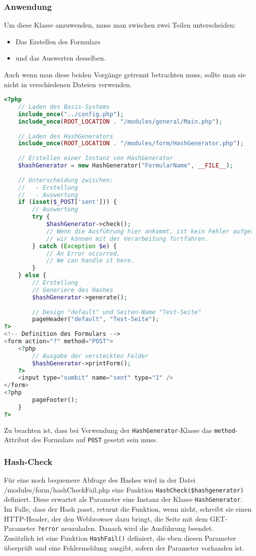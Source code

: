 \subsubsection{Anwendung}
Um diese Klasse anzuwenden, muss man zwischen zwei Teilen unterscheiden:
\begin{itemize}
	\item Das Erstellen des Formulars
	\item und das Auswerten desselben.
\end{itemize}
Auch wenn man diese beiden Vorgänge getrennt betrachten muss, sollte man sie nicht in verschiedenen Dateien verwenden.\\
\begin{lstlisting}[style=custom, language=php, caption={Anwendung von \texttt{HashGenerator}},label={lst:content_imple_hash_example}]
<?php
	// Laden des Basis-Systems
	include_once("../config.php");
	include_once(ROOT_LOCATION . "/modules/general/Main.php");
	
	// Laden des HashGenerators
	include_once(ROOT_LOCATION . "/modules/form/HashGenerator.php");
	
	// Erstellen einer Instanz von HashGenerator
	$hashGenerator = new HashGenerator("FormularName", __FILE__);
	
	// Unterscheidung zwischen:
	//   - Erstellung
	//   - Auswertung
	if (isset($_POST['sent'])) {
		// Auswertung
		try {
			$hashGenerator->check();
			// Wenn die Ausführung hier ankommt, ist kein Fehler aufgetreten,
			// wir können mit der Verarbeitung fortfahren.
		} catch (Exception $e) {
			// An Error occurred.
			// We can handle it here.
		}
	} else {
		// Erstellung
		// Generiere des Hashes
		$hashGenerator->generate();
		
		// Design "default" und Seiten-Name "Test-Seite"
		pageHeader("default", "Test-Seite");
?>
<!-- Definition des Formulars -->
<form action="?" method="POST">
	<?php
		// Ausgabe der versteckten Felder
		$hashGenerator->printForm();
	?>
	<input type="sumbit" name="sent" type="1" />
</form>
<?php
		pageFooter();
	}
?>
\end{lstlisting}
Zu beachten ist, dass bei Verwendung der \texttt{HashGenerator}-Klasse das \texttt{method}-Attribut des Formulars auf \texttt{POST} gesetzt sein muss.

\subsubsection{Hash-Check}
Für eine noch bequemere Abfrage des Hashes wird in der Datei /modules/form/hashCheckFail.php eine Funktion \texttt{HashCheck(\$hashgenerator)} definiert. Diese erwartet als Parameter eine Instanz der Klasse \texttt{HashGenerator}. Im Falle, dass der Hash passt, returnt die Funktion, wenn nicht, schreibt sie einen HTTP-Header, der den Webbrowser dazu bringt, die Seite mit dem GET-Parameter \texttt{?error} neuzuladen. Danach wird die Ausführung beendet.\\
Zusätzlich ist eine Funktion \texttt{HashFail()} definiert, die eben diesen Parameter überprüft und eine Fehlermeldung ausgibt, sofern der Parameter vorhanden ist.